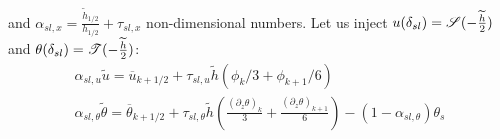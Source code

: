 and
    $\alpha_{sl, x} = \frac{\widetilde{h}_{1/2}}{h_{1/2}} +
    \tau_{sl, x}$
non-dimensional numbers.
Let us inject $u(\delta_{sl}) =
{\cal S}(-\frac{\widetilde{h}}{2})$ and
$\theta(\delta_{sl}) = {\cal T}(-\frac{\widetilde{h}}{2})$:
\begin{equation}
\begin{aligned}
\label{eq:ND_StratifiedCase_relation_tilde_bar}
\alpha_{sl, u}\widetilde{u} = \overline{u}_{k+1/2} +
	\tau_{sl, u}
\widetilde{h}
	(\phi_k/3 + \phi_{k+1}/6) \\
\alpha_{sl, \theta}
\widetilde{\theta}
= \overline{\theta}_{k+1/2} + \tau_{sl, \theta}
	\widetilde{h}(\frac{{(\partial_z \theta)}_k}{3} + \frac{{(\partial_z \theta)}_{k+1}}{6})
 - (1 - \alpha_{sl, \theta})\theta_s
\end{aligned}
\end{equation}


